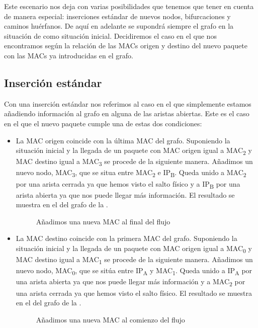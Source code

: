 \documentclass[twoside, 12pt]{epstfg}
\begin{document}
Este escenario nos deja con varias posibilidades que tenemos que tener en cuenta de manera especial: inserciones estándar de nuevos nodos, bifurcaciones y caminos huérfanos. De aquí en adelante se supondrá siempre el grafo en la situación de  como situación inicial. Decidiremos el caso en el que nos encontramos según la relación de las MACs origen y destino del nuevo paquete con las MACs ya introducidas en el grafo.

\subsection{Inserción estándar}
Con una inserción estándar nos referimos al caso en el que simplemente estamos añadiendo información al grafo en alguna de las aristas abiertas. Este es el caso en el que el nuevo paquete cumple una de estas dos condiciones:
\begin{itemize}
    \item La MAC origen coincide con la última MAC del grafo. Suponiendo la situación inicial y la llegada de un paquete con MAC origen igual a MAC\textsubscript{2} y MAC destino igual a MAC\textsubscript{3} se procede de la siguiente manera. Añadimos un nuevo nodo, MAC\textsubscript{3}, que se situa entre MAC\textsubscript{2} e IP\textsubscript{B}. Queda unido a  MAC\textsubscript{2} por una arista cerrada ya que hemos visto el salto físico y a IP\textsubscript{B} por una arista abierta ya que nos puede llegar más información. El resultado se muestra en el del grafo de la .
    \begin{figure}[H]
    \centering
    
    \caption[Ejemplo inserción básica 1]{Añadimos una nueva MAC al final del flujo}
    \label{fig:Analisis:AddingLast}
    \end{figure}
    \item La MAC destino coincide con la primera MAC del grafo. Suponiendo la situación inicial y la llegada de un paquete con MAC origen igual a MAC\textsubscript{0} y MAC destino igual a MAC\textsubscript{1} se procede de la siguiente manera. Añadimos un nuevo nodo, MAC\textsubscript{0}, que se sitúa entre IP\textsubscript{A} y MAC\textsubscript{1}. Queda unido a IP\textsubscript{A} por una arista abierta ya que nos puede llegar más información y a  MAC\textsubscript{2} por una arista cerrada ya que hemos visto el salto físico. El resultado se muestra en el del grafo de la .
    \begin{figure}[H]
    \centering
    
    \caption[Ejemplo inserción básica 2]{Añadimos una nueva MAC al comienzo del flujo}
    \label{fig:Analisis:AddingFirst}
    \end{figure}
\end{itemize}
\end{document}
